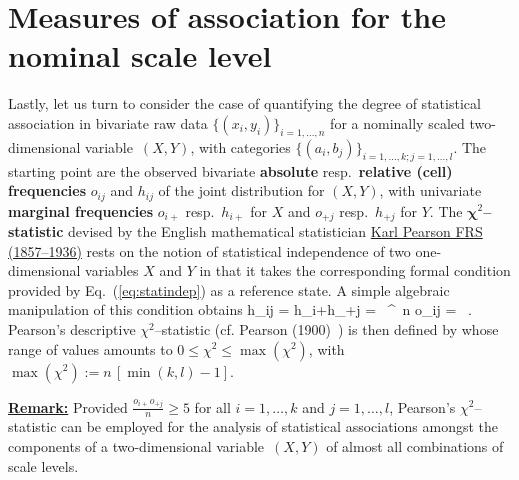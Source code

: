 \section[Measures of association for the nominal scale
level]{Measures of association for the nominal scale level}
Lastly, let us turn to consider the case of quantifying 
the degree of statistical association in bivariate raw data 
$\{(x_{i},y_{i})\}_{i=1,\ldots,n}$ for a nominally scaled 
two-dimensional variable~$(X,Y)$, with categories 
$\{(a_{i},b_{j})\}_{i=1,\ldots,k;j=1,\ldots,l}$. The starting 
point are the observed bivariate \textbf{absolute}
resp.\ \textbf{relative (cell) frequencies} $o_{ij}$ and $h_{ij}$
of the joint distribution for $(X,Y)$, with univariate
\textbf{marginal frequencies} $o_{i+}$ resp.\ $h_{i+}$ for $X$ and
$o_{+ j}$ resp.\ $h_{+ j}$ for $Y$. The
\textbf{$\boldsymbol{\chi}^{2}$--statistic} 
devised by the English mathematical statistician 
\href{http://www-history.mcs.st-and.ac.uk/Biographies/Pearson.html}{Karl
Pearson FRS (1857--1936)} rests on the notion of statistical 
independence of two one-dimensional variables $X$ and $Y$ in that 
it takes the corresponding formal condition provided by 
Eq.~(\ref{eq:statindep}) as a reference state. A simple algebraic 
manipulation of this condition obtains 
%
\be
h_{ij} = h_{i+}h_{+j}
\quad\Rightarrow\quad
{} = \,
\quad\overbrace{\Rightarrow}^{\ n}\quad
o_{ij} =  \ .
\ee
%
Pearson's descriptive $\chi^{2}$--statistic (cf. Pearson 
(1900)~) is then defined by
%
\be
{}
\ee
%
whose range of values amounts to $0 \leq \chi^{2} \leq 
\max(\chi^{2})$, with $\max(\chi^{2}):=n\,[\min(k,l)-1]$.

\medskip
\noindent
\underline{\textbf{Remark:}} Provided $\displaystyle 
\frac{o_{i+}o_{+j}}{n} \geq 5$ for all $i=1, \ldots, k$ and $j=1, 
\ldots, l$, Pearson's $\chi^{2}$--statistic can be employed for 
the analysis of statistical associations amongst the components of 
a two-dimensional variable~$(X,Y)$ of almost all combinations of 
scale levels.

